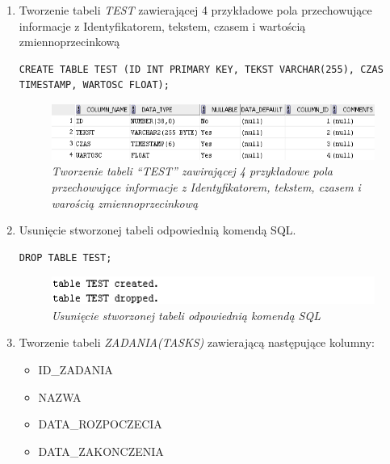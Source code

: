\documentclass{article}
\begin{document}
\begin{enumerate}
\item Tworzenie tabeli \emph{TEST} zawierającej 4 przykładowe pola przechowujące informacje z Identyfikatorem, tekstem, czasem i wartością zmiennoprzecinkową

\begin{lstlisting}[style=SQL, caption=\textit{Tworzenie tabeli ``TEST'' zawirającej 4 przykładowe pola przechowujące informacje z Identyfikatorem, tekstem, czasem i warością zmiennoprzecinkową}]
CREATE TABLE TEST (ID INT PRIMARY KEY, TEKST VARCHAR(255), CZAS TIMESTAMP, WARTOSC FLOAT);
\end{lstlisting}

\begin{figure}[H]
	\centering
	\includegraphics[scale=1]{zadanie1.png}
	\caption{\textit{Tworzenie tabeli ``TEST'' zawirającej 4 przykładowe pola przechowujące informacje z Identyfikatorem, tekstem, czasem i warością zmiennoprzecinkową}}
\end{figure}

\item Usunięcie stworzonej tabeli odpowiednią komendą SQL.

\begin{lstlisting}[style=SQL,caption=\textit{Usunięcie stworzonej tabeli odpowiednią komendą SQL}]
DROP TABLE TEST;
\end{lstlisting}

\begin{figure}[H]
	\centering
	\includegraphics[scale=1]{zadanie2.png}
	\caption{\textit{Usunięcie stworzonej tabeli odpowiednią komendą SQL}}
\end{figure}

\item Tworzenie tabeli \emph{ZADANIA(TASKS)} zawierającą następujące kolumny:
\begin{itemize}
\item ID\_ZADANIA
\item NAZWA
\item DATA\_ROZPOCZECIA
\item DATA\_ZAKONCZENIA
\end{itemize}


\end{enumerate}
\end{document}
